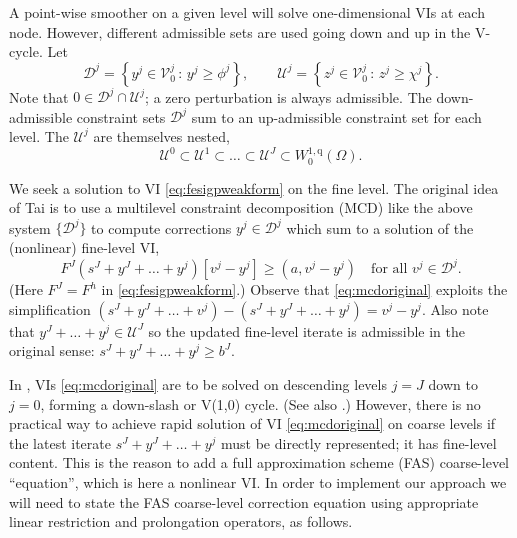\documentclass[letterpaper,final,12pt,reqno]{amsart}
\theoremstyle{claim}
\newcommand{\qq}{{\text{q}}}
\numberwithin{equation}{section}
\numberwithin{figure}{section}
\numberwithin{table}{section}
\numberwithin{theorem}{section}
\begin{document}
A point-wise smoother on a given level will solve one-dimensional VIs at each node.  However, different admissible sets are used going down and up in the V-cycle.  Let
\begin{equation}
\mathcal{D}^j = \left\{y^j \in \mathcal{V}_0^j \,:\, y^j \ge \phi^j\right\}, \qquad \mathcal{U}^j = \left\{z^j \in \mathcal{V}_0^j \,:\, z^j \ge \chi^j\right\}. \label{eq:downupsets}
\end{equation}
Note that $0 \in \mathcal{D}^j \cap \mathcal{U}^j$; a zero perturbation is always admissible.  The down-admissible constraint sets $\mathcal{D}^j$ sum to an up-admissible constraint set for each level.  The $\mathcal{U}^j$ are themselves nested,
\begin{equation}
\mathcal{U}^0 \subset \mathcal{U}^1 \subset \dots \subset \mathcal{U}^J \subset W_0^{1,\qq}(\Omega). \label{eq:innerconeapprox}
\end{equation}

We seek a solution to VI \eqref{eq:fesigpweakform} on the fine level.  The original idea of Tai \cite{Tai2003} is to use a multilevel constraint decomposition (MCD) like the above  system $\{\mathcal{D}^j\}$ to compute corrections $y^j \in \mathcal{D}^j$ which sum to a solution of the (nonlinear) fine-level VI,
\begin{equation}
F^J(s^J + y^J + \dots + y^j)[v^j - y^j] \ge (a,v^j - y^j) \quad \text{for all } v^j \in \mathcal{D}^j. \label{eq:mcdoriginal}
\end{equation}
(Here $F^J = F^h$ in \eqref{eq:fesigpweakform}.)  Observe that \eqref{eq:mcdoriginal} exploits the simplification $(s^J + y^J + \dots + v^j) - (s^J + y^J + \dots + y^j) = v^j - y^j$.  Also note that $y^J + \dots + y^j \in \mathcal{U}^J$ so the updated fine-level iterate is admissible in the original sense: $s^J + y^J + \dots + y^j \ge b^J$.

In \cite{Tai2003}, VIs \eqref{eq:mcdoriginal} are to be solved on descending levels $j=J$ down to $j=0$, forming a down-slash or V(1,0) cycle.  (See also \cite[Algorithm 4.7]{GraeserKornhuber2009}.)  However, there is no practical way to achieve rapid solution of VI \eqref{eq:mcdoriginal} on coarse levels if the latest iterate $s^J + y^J + \dots + y^j$ must be directly represented; it has fine-level content.  This is the reason to add a full approximation scheme (FAS) \cite{Trottenbergetal2001} coarse-level ``equation'', which is here a nonlinear VI.  In order to implement our approach we will need to state the FAS coarse-level correction equation using appropriate linear restriction and prolongation operators, as follows.
\end{document}
